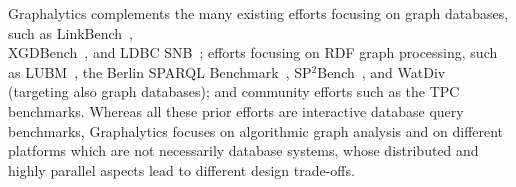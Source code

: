 Graphalytics complements the many existing efforts focusing on graph databases, such as 
LinkBench~\cite{DBLP:conf/sigmod/ArmstrongPBC13}, 
\\XGDBench~\cite{DBLP:journals/ase/DayarathnaS14}, and 
LDBC SNB~\cite{DBLP:conf/sigmod/ErlingALCGPPB15,DBLP:conf/grades/SzarnyasPAMPKEB18};  
efforts focusing on RDF graph processing, such as 
LUBM~\cite{DBLP:journals/ws/GuoPH05},
the Berlin {SPARQL} Benchmark~\cite{DBLP:journals/ijswis/BizerS09},
SP$^2$Bench~\cite{DBLP:conf/icde/SchmidtHLP09},
and WatDiv~\cite{DBLP:conf/semweb/AlucHOD14} (targeting also graph databases);
and community efforts such as the TPC benchmarks.
Whereas all these prior efforts are interactive database query benchmarks, Graphalytics focuses on algorithmic graph analysis and on different platforms which are not necessarily database systems, whose distributed and highly parallel aspects lead to different design trade-offs.


